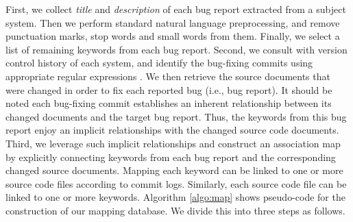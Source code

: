 \documentclass[conference]{IEEEtran}
\begin{document}
First, we collect \emph{title} and \emph{description} of each bug report extracted from a subject system.  
Then we perform standard natural language preprocessing, and remove punctuation marks, stop words and small words from them. Finally, we select a list of remaining keywords from each bug report. 
Second, we consult with version control history of each system, and identify the bug-fixing commits using appropriate regular expressions \cite{bugid,Wang2}. We then retrieve the source documents 
that were changed in order to fix each reported bug (i.e., bug report).
It should be noted each bug-fixing commit establishes an inherent relationship between its changed documents and the target bug report. 
Thus, the keywords from this bug report enjoy an implicit relationships with the changed source code documents. 
Third, we leverage such implicit relationships and construct an association map by explicitly connecting keywords from each bug report and the corresponding changed source documents.
Mapping each keyword can be linked to one or more source code files according to commit logs. Similarly, each source code file can be linked to one or more keywords. 
Algorithm \ref{algo:map} shows pseudo-code for the construction of our mapping database. 
We divide this into three steps as follows.  

\end{document}
